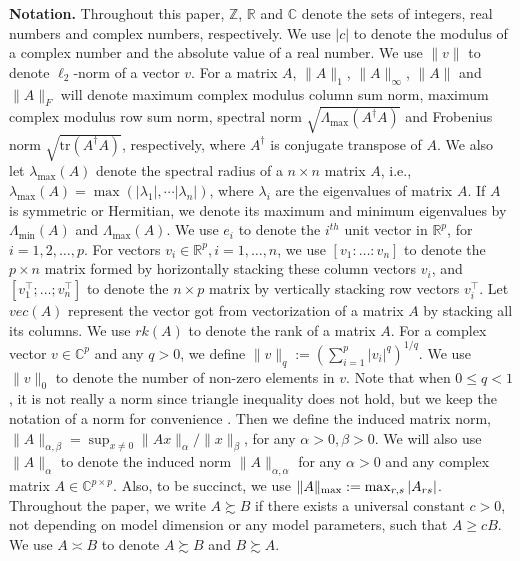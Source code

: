 \textbf{Notation.} Throughout this paper, $\mathbb{Z}$, $\mathbb{R}$ and $\mathbb{C}$  denote the sets of integers, real numbers and complex numbers, respectively. We use $|c|$ to denote the modulus of a complex number and the absolute value of a real number. We use $\|v\|$ to denote $\ell_2$-norm of a vector $v$. For a matrix $A$, $\|A\|_1$, $\|A\|_{\infty}$, $\|A\|$ and $\|A\|_F$ will denote maximum complex modulus column sum norm, maximum complex modulus row sum norm, { spectral norm} $\sqrt{\Lambda_{\max}(A^\dag A)}$ and Frobenius norm $\sqrt{\text{tr}(A^\dag A)}$, respectively, where $A^\dag$ is conjugate transpose of $A$. We also let $\lambda_{\text{max}}(A)$ denote the spectral radius of a $n \times n$ matrix $A$, i.e., $\lambda_{\text{max}}(A) = \max(|\lambda_1|, \cdots |\lambda_n|)$, where $\lambda_i$ are the eigenvalues of matrix $A$. If $A$ is symmetric or Hermitian, we denote its maximum and minimum eigenvalues by $\Lambda_{\min}(A)$ and $\Lambda_{\max}(A)$. We use $e_i$ to denote the $i^{th}$ unit vector in $\mathbb{R}^p$, for $i = 1, 2, \ldots, p$. For vectors $v_i \in \mathbb{R}^p, i=1,\ldots, n$, we use $[v_1:\ldots:v_n]$ to denote the $p \times n$ matrix formed  by horizontally stacking these column vectors $v_i$, and  $[v_1^\top;\ldots; v_n^\top]$ to denote the $n\times p$ matrix by vertically stacking row vectors $v_i^\top$. Let $vec(A)$ represent the vector got from vectorization of a matrix $A$ by stacking all its columns. We use $rk(A)$ to denote the rank of a matrix $A$. For a complex vector $v\in \mathbb{C}^p$ and any $q > 0$, we define $\|v\|_q:= (\sum_{i=1}^p |v_i|^q)^{1/q}$. We use $\|v\|_0$ to denote the number of non-zero elements in $v$. Note that when $0\le q<1$, it is not really a norm since triangle inequality does not hold, but we keep the notation of a norm for convenience . Then we define the induced matrix norm, $\|A\|_{\alpha, \beta} = \sup_{x\neq 0}\|Ax\|_\alpha/\|x\|_\beta$, for any  $\alpha>0, \beta>0$. We will also use $\|A\|_\alpha$ to denote the induced norm $\|A\|_{\alpha, \alpha}$ for any $\alpha > 0$ and any complex matrix $A \in \mathbb{C}^{p \times p}$. Also, to be succinct, we use $\|A\|_{\rm{max}} :=\max_{r,s}|A_{rs}|$. 
Throughout the paper, we write $A \succsim B$ if there exists a  universal constant $c > 0$, not depending on model dimension or any model parameters, such that $A \ge cB$. We use $A \asymp B$ to denote $A \succsim B$ and $B \succsim A$. 

